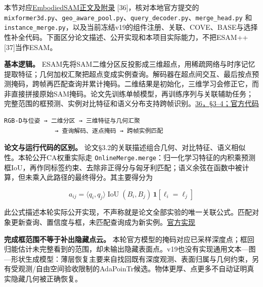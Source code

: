 \documentclass[UTF8,fontset=fandol]{ctexart}
\begin{document}
本节对应\href{https://arxiv.org/html/2408.11811v3}{EmbodiedSAM正文及附录} [36]，核对本地官方提交的 \texttt{mixformer3d.\allowbreak{}py}、\texttt{geo\_\allowbreak{}aware\_\allowbreak{}pool.\allowbreak{}py}、\texttt{query\_\allowbreak{}decoder.\allowbreak{}py}、\texttt{merge\_\allowbreak{}head.\allowbreak{}py} 和 \texttt{instance\_\allowbreak{}merge.\allowbreak{}py}，以及当前冻结v19的组件注册、关联、COVE、BASE与选择性补全代码。下面区分论文描述、公开实现和本项目实际能力，不把ESAM++ [37]当作ESAM。



\textbf{基本逻辑。} ESAM先将SAM二维分区反投影成三维超点，用稀疏网络与时序记忆提取特征；几何加权汇聚把超点变成实例查询。解码器在超点间交互、最后按点预测掩码，跨帧再匹配查询并累计掩码。二维结果是初始化，三维学习会修正它，而非直接拼接原始SAM掩码。论文先训练单帧模型，再训练序列与关联辅助任务；完整范围的框预测、实例对比特征和语义分布支持跨帧识别。\href{https://github.com/xuxw98/ESAM/tree/main/oneformer3d}{36，§3–4；官方代码}



\begin{verbatim}
RGB-D与位姿 → 二维分区 → 三维特征与几何汇聚
              → 查询解码、逐点掩码 → 跨帧实例匹配
\end{verbatim}


\textbf{论文与运行代码的区别。} 论文§3.2的关联描述组合几何、对比特征、语义相似性。本轮公开CA权重实际走 \texttt{OnlineMerge.\allowbreak{}merge}：归一化学习特征的内积乘预测框IoU，再作同标签约束、去除非正得分与匈牙利匹配；语义余弦在函数中被计算，但未乘入此路径的最终得分。其主要得分为



\[
a_{ij}=\langle q_i,q_j\rangle\operatorname{IoU}(B_i,B_j)\,\mathbf{1}[\ell_i=\ell_j]
\]

此公式描述本轮实际公开实现，不声称就是论文全部实验的唯一关联公式。匹配对象更新查询、置信度与框，未匹配查询成为新实例。\href{https://github.com/xuxw98/ESAM/blob/main/oneformer3d/instance\_merge.py}{官方实现}



\textbf{完成框范围不等于补出隐藏点云。} 本轮官方模型的掩码对应已采样深度点；框回归能估计未完整看到的范围，却未输出隐藏表面点。v19也没有实现通用文本—图—形状生成模型：薄层恢复主要来自找回既有深度观测、表面归属与几何约束，另有受观测/自由空间验收限制的AdaPoinTr候选。物体更厚、点更多不自动证明真实隐藏几何被正确恢复。
\end{document}

